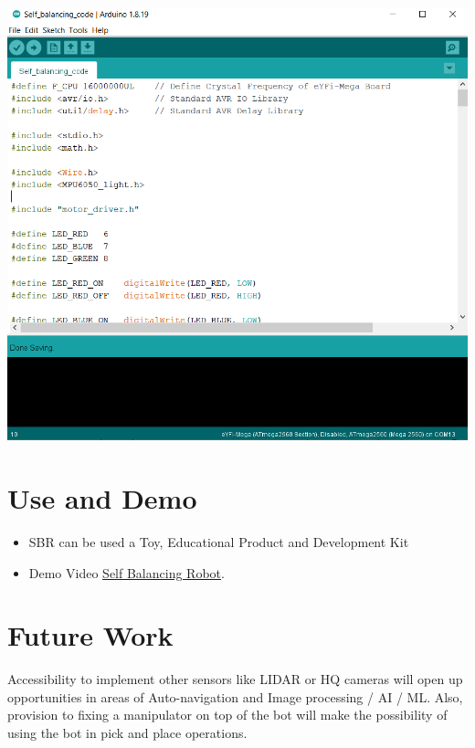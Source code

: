 \documentclass[12pt,a4paper,oneside]{book}
\begin{document}
  \begin{center}
    \includegraphics[scale=0.7]{SELF BALANCING CODE}
  \end{center}

\pagebreak
  
		
		
	\section*{Use and Demo}
		\begin{itemize}
    			\item SBR can be used a Toy, Educational Product and Development Kit
    			\item Demo Video \href{https://github.com/eYSIP-2022/71-Self_Balancing_Robot_Development/blob/main/Assets/Self_balancing_Robot_Demo.mp4}{Self Balancing Robot}.
  \end{itemize}
		

	\section*{Future Work}
		Accessibility to implement other sensors like LIDAR or HQ cameras will open up opportunities in areas of Auto-navigation and Image processing / AI / ML. Also, provision to fixing a manipulator on top of the bot will make the possibility of using the bot in pick and place operations. 
		
\end{document}
